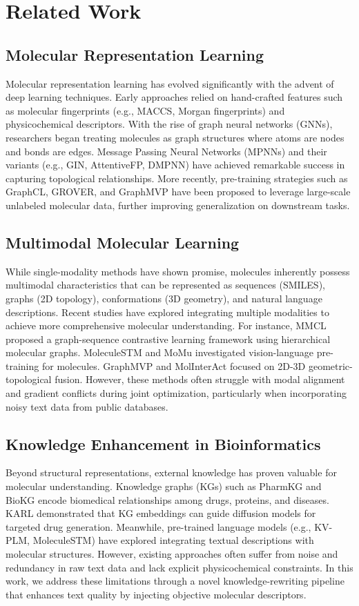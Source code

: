 \documentclass[journal]{IEEEtran}
\begin{document}
\section{Related Work}
\label{sec:related}
\subsection{Molecular Representation Learning}
Molecular representation learning has evolved significantly with the advent of deep learning techniques. Early approaches relied on hand-crafted features such as molecular fingerprints (e.g., MACCS, Morgan fingerprints) and physicochemical descriptors. With the rise of graph neural networks (GNNs), researchers began treating molecules as graph structures where atoms are nodes and bonds are edges. Message Passing Neural Networks (MPNNs) and their variants (e.g., GIN, AttentiveFP, DMPNN) have achieved remarkable success in capturing topological relationships. More recently, pre-training strategies such as GraphCL, GROVER, and GraphMVP have been proposed to leverage large-scale unlabeled molecular data, further improving generalization on downstream tasks.

\subsection{Multimodal Molecular Learning}
While single-modality methods have shown promise, molecules inherently possess multimodal characteristics that can be represented as sequences (SMILES), graphs (2D topology), conformations (3D geometry), and natural language descriptions. Recent studies have explored integrating multiple modalities to achieve more comprehensive molecular understanding. For instance, MMCL proposed a graph-sequence contrastive learning framework using hierarchical molecular graphs. MoleculeSTM and MoMu investigated vision-language pre-training for molecules. GraphMVP and MolInterAct focused on 2D-3D geometric-topological fusion. However, these methods often struggle with modal alignment and gradient conflicts during joint optimization, particularly when incorporating noisy text data from public databases.

\subsection{Knowledge Enhancement in Bioinformatics}
Beyond structural representations, external knowledge has proven valuable for molecular understanding. Knowledge graphs (KGs) such as PharmKG and BioKG encode biomedical relationships among drugs, proteins, and diseases. KARL demonstrated that KG embeddings can guide diffusion models for targeted drug generation. Meanwhile, pre-trained language models (e.g., KV-PLM, MoleculeSTM) have explored integrating textual descriptions with molecular structures. However, existing approaches often suffer from noise and redundancy in raw text data and lack explicit physicochemical constraints. In this work, we address these limitations through a novel knowledge-rewriting pipeline that enhances text quality by injecting objective molecular descriptors.
\end{document}
